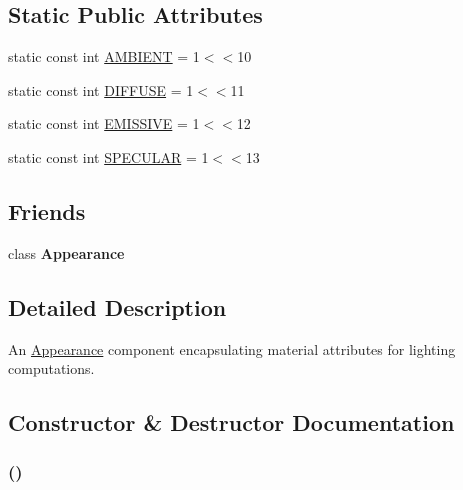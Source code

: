 \subsection*{Static Public Attributes}
\begin{CompactItemize}
\item 
static const int \hyperlink{classm3g_1_1Material_4cf648a82d9de62a1fb15f4277049594}{AMBIENT} = 1$<$$<$10
\item 
static const int \hyperlink{classm3g_1_1Material_9798073e44254569f47464dc6bf5da89}{DIFFUSE} = 1$<$$<$11
\item 
static const int \hyperlink{classm3g_1_1Material_b92d57adf6955eae6adac15e865659cd}{EMISSIVE} = 1$<$$<$12
\item 
static const int \hyperlink{classm3g_1_1Material_cac20b25665d9a3713bec3a772a89ede}{SPECULAR} = 1$<$$<$13
\end{CompactItemize}
\subsection*{Friends}
\begin{CompactItemize}
\item 
\hypertarget{classm3g_1_1Material_afa5201a494f65c37039281d9b63a2a9}{
class \textbf{Appearance}}
\label{classm3g_1_1Material_afa5201a494f65c37039281d9b63a2a9}

\end{CompactItemize}


\subsection{Detailed Description}
An \hyperlink{classm3g_1_1Appearance}{Appearance} component encapsulating material attributes for lighting computations. 

\subsection{Constructor \& Destructor Documentation}
\hypertarget{classm3g_1_1Material_ade2019060d01e7983e9bc40ea6aa404}{
\subsubsection[{Material}]{ ()}}
\label{classm3g_1_1Material_ade2019060d01e7983e9bc40ea6aa404}


